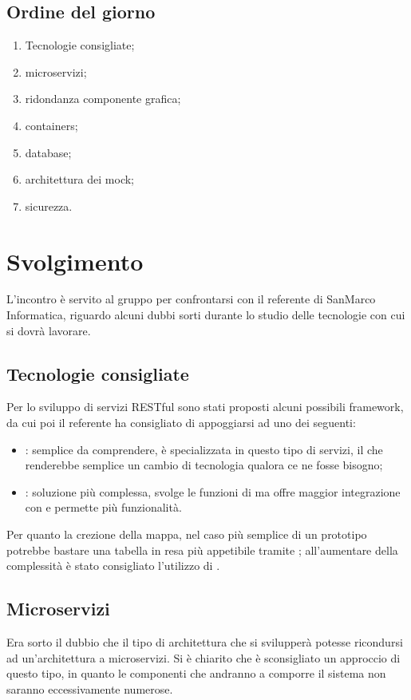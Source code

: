 \documentclass[]{article}
\begin{document}
		\subsection{Ordine del giorno}
		\begin{enumerate}
			\item Tecnologie consigliate;
			\item microservizi;
			\item ridondanza componente grafica;
			\item containers;
			\item database;
			\item architettura dei mock;
			\item sicurezza.
		\end{enumerate}
\newpage	
	\section{Svolgimento}
	L'incontro è servito al gruppo per confrontarsi con il referente di SanMarco Informatica, riguardo alcuni dubbi sorti durante lo studio delle tecnologie con cui si dovrà lavorare.
	
		\subsection{Tecnologie consigliate}
		Per lo sviluppo di servizi RESTful sono stati proposti alcuni possibili framework, da cui poi il referente ha consigliato di appoggiarsi ad uno dei seguenti:
		\begin{itemize}
			\item \textbf{}: semplice da comprendere, è specializzata in questo tipo di servizi, il che renderebbe semplice un cambio di tecnologia qualora ce ne fosse bisogno;
			\item \textbf{}: soluzione più complessa, svolge le funzioni di  ma offre maggior integrazione con  e permette più funzionalità.
		\end{itemize}
		Per quanto la crezione della mappa, nel caso più semplice di un prototipo potrebbe bastare una tabella in  resa più appetibile tramite ; all'aumentare della complessità è stato consigliato l'utilizzo di .
	
		\subsection{Microservizi}
		Era sorto il dubbio che il tipo di architettura che si svilupperà potesse ricondursi ad un'architettura a microservizi. Si è chiarito che è sconsigliato un approccio di questo tipo, in quanto le componenti che andranno a comporre il sistema non saranno eccessivamente numerose.
		
\end{document}
